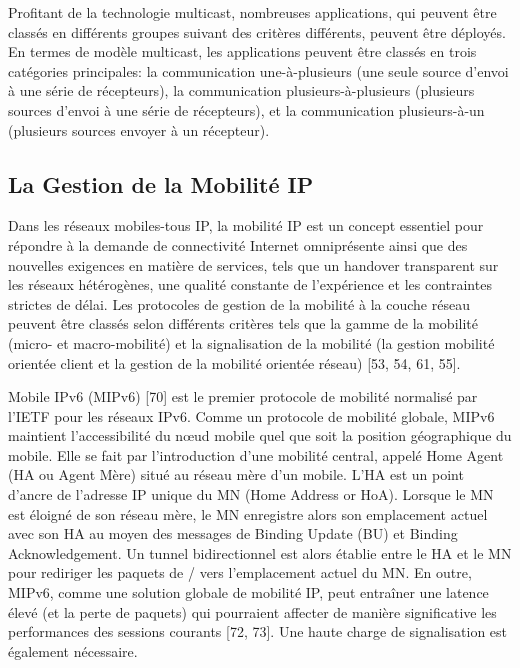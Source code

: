 Profitant de la technologie multicast, nombreuses applications, qui peuvent être classés en différents groupes suivant des critères différents, peuvent être déployés. En termes de modèle multicast, les applications peuvent être classés en trois catégories principales: la communication une-à-plusieurs (une seule source d'envoi à une série de récepteurs), la communication plusieurs-à-plusieurs (plusieurs sources d'envoi à une série de récepteurs), et la communication plusieurs-à-un (plusieurs sources envoyer à un récepteur).

\subsection{La Gestion de la Mobilité IP}
Dans les réseaux mobiles-tous IP, la mobilité IP est un concept essentiel pour répondre à la demande de connectivité Internet omniprésente ainsi que des nouvelles exigences en matière de services, tels que un handover transparent sur les réseaux hétérogènes, une qualité constante de l'expérience et les contraintes strictes de délai. Les protocoles de gestion de la mobilité à la couche réseau peuvent être classés selon différents critères tels que la gamme de la mobilité (micro- et macro-mobilité) et la signalisation de la mobilité (la gestion mobilité orientée client et la gestion de la mobilité orientée réseau) [53, 54, 61, 55].

Mobile IPv6 (MIPv6) [70] est le premier protocole de mobilité normalisé par l'IETF pour les réseaux IPv6. Comme un protocole de mobilité globale, MIPv6 maintient l'accessibilité du nœud mobile quel que soit la position géographique du mobile. Elle se fait par l'introduction d'une mobilité central, appelé Home Agent (HA ou Agent Mère) situé au réseau mère d'un mobile. L'HA est un point d'ancre de l'adresse IP unique du MN (Home Address or HoA). Lorsque le MN est éloigné de son réseau mère, le MN enregistre alors son emplacement actuel avec son HA au moyen des messages de Binding Update (BU) et Binding Acknowledgement. Un tunnel bidirectionnel est alors établie entre le HA et le MN pour rediriger les paquets de / vers l'emplacement actuel du MN. En outre, MIPv6, comme une solution globale de mobilité IP, peut entraîner une latence élevé (et la perte de paquets) qui pourraient affecter de manière significative les performances des sessions courants [72, 73]. Une haute charge de signalisation est également nécessaire.

